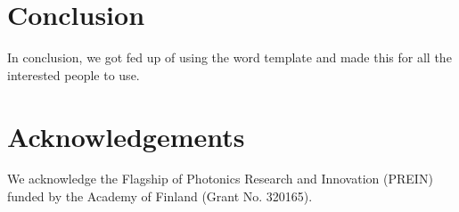 \documentclass[letterpaper,10pt]{article}
\begin{document}
\section{Conclusion}
In conclusion, we got fed up of using the word template and made this for all the interested people to use.

\section*{Acknowledgements}
We acknowledge the Flagship of Photonics Research and Innovation (PREIN) funded by the Academy of Finland (Grant No. 320165).

\printbibliography[title={References}]


\end{document}
